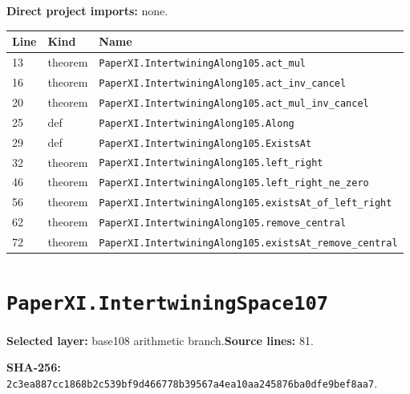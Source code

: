 \documentclass[10pt,oneside]{book}
\begin{document}

\textbf{Direct project imports:} none.

\begin{longtable}{@{}p{}p{}p{}@{}}\toprule Line&Kind&Name\\\midrule\endhead

13&theorem&\nolinkurl{PaperXI.IntertwiningAlong105.act_mul}\\

16&theorem&\nolinkurl{PaperXI.IntertwiningAlong105.act_inv_cancel}\\

20&theorem&\nolinkurl{PaperXI.IntertwiningAlong105.act_mul_inv_cancel}\\

25&def&\nolinkurl{PaperXI.IntertwiningAlong105.Along}\\

29&def&\nolinkurl{PaperXI.IntertwiningAlong105.ExistsAt}\\

32&theorem&\nolinkurl{PaperXI.IntertwiningAlong105.left_right}\\

46&theorem&\nolinkurl{PaperXI.IntertwiningAlong105.left_right_ne_zero}\\

56&theorem&\nolinkurl{PaperXI.IntertwiningAlong105.existsAt_of_left_right}\\

62&theorem&\nolinkurl{PaperXI.IntertwiningAlong105.remove_central}\\

72&theorem&\nolinkurl{PaperXI.IntertwiningAlong105.existsAt_remove_central}\\

\bottomrule\end{longtable}

\section{\texorpdfstring{\nolinkurl{PaperXI.IntertwiningSpace107}}{PaperXI.IntertwiningSpace107}}\label{module:PaperXI.IntertwiningSpace107}

\textbf{Selected layer:} base108 arithmetic branch.\quad\textbf{Source lines:} 81.\par\textbf{SHA-256:} {\scriptsize\nolinkurl{2c3ea887cc1868b2c539bf9d466778b39567a4ea10aa245876ba0dfe9bef8aa7}}.
\end{document}
